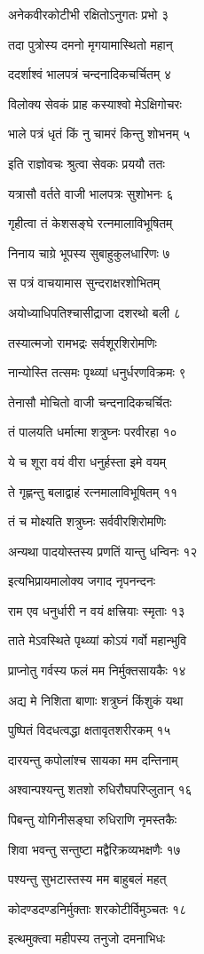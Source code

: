 अनेकवीरकोटीभी रक्षितोऽनुगतः प्रभो ३

तदा पुत्रोस्य दमनो मृगयामास्थितो महान्

ददर्शाश्वं भालपत्रं चन्दनादिकचर्चितम् ४

विलोक्य सेवकं प्राह कस्याश्वो मेऽक्षिगोचरः

भाले पत्रं धृतं किं नु चामरं किन्तु शोभनम् ५

इति राज्ञोवचः श्रुत्वा सेवकः प्रययौ ततः

यत्रासौ वर्तते वाजी भालपत्रः सुशोभनः ६

गृहीत्वा तं केशसङ्घे रत्नमालाविभूषितम्

निनाय चाग्रे भूपस्य सुबाहुकुलधारिणः ७

स पत्रं वाचयामास सुन्दराक्षरशोभितम्

अयोध्याधिपतिश्चासीद्राजा दशरथो बली ८

तस्यात्मजो रामभद्रः सर्वशूरशिरोमणिः

नान्योस्ति तत्समः पृथ्व्यां धनुर्धरणविक्रमः ९

तेनासौ मोचितो वाजी चन्दनादिकचर्चितः

तं पालयति धर्मात्मा शत्रुघ्नः परवीरहा १०

ये च शूरा वयं वीरा धनुर्हस्ता इमे वयम्

ते गृह्णन्तु बलाद्वाहं रत्नमालाविभूषितम् ११

तं च मोक्ष्यति शत्रुघ्नः सर्ववीरशिरोमणिः

अन्यथा पादयोस्तस्य प्रणतिं यान्तु धन्विनः १२

इत्यभिप्रायमालोक्य जगाद नृपनन्दनः

राम एव धनुर्धारी न वयं क्षत्त्रियाः स्मृताः १३

ताते मेऽवस्थिते पृथ्व्यां कोऽयं गर्वो महान्भुवि

प्राप्नोतु गर्वस्य फलं मम निर्मुक्तसायकैः १४

अद्य मे निशिता बाणाः शत्रुघ्नं किंशुकं यथा

पुष्पितं विदधत्वद्धा क्षतावृतशरीरकम् १५

दारयन्तु कपोलांश्च सायका मम दन्तिनाम्

अश्वान्पश्यन्तु शतशो रुधिरौघपरिप्लुतान् १६

पिबन्तु योगिनीसङ्घा रुधिराणि नृमस्तकैः

शिवा भवन्तु सन्तुष्टा मद्वैरिक्रव्यभक्षणैः १७

पश्यन्तु सुभटास्तस्य मम बाहुबलं महत्

कोदण्डदण्डनिर्मुक्ताः शरकोटीर्विमुञ्चतः १८

इत्थमुक्त्वा महीपस्य तनुजो दमनाभिधः

